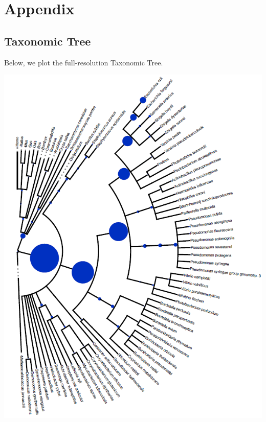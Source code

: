 \documentclass[10pt,twocolumn,letterpaper]{article}
\begin{document}
\clearpage %
\onecolumn %

\section{Appendix}


\subsection{Taxonomic Tree}
\label{sec:taxtree}

Below, we plot the full-resolution Taxonomic Tree. \\
\begin{center}
    \includegraphics[]{report/img/taxonomy_tree.png}
\end{center}
\end{document}
